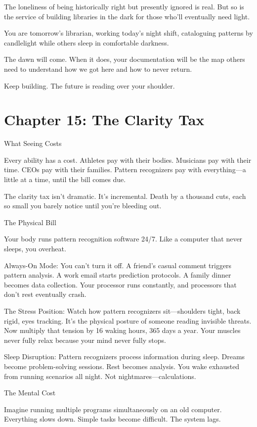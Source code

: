 \documentclass[12pt,oneside]{book}
\begin{document}
The loneliness of being historically right but presently ignored is real. But so is the service of building libraries in the dark for those who'll eventually need light.

You are tomorrow's librarian, working today's night shift, cataloguing patterns by candlelight while others sleep in comfortable darkness.

The dawn will come. When it does, your documentation will be the map others need to understand how we got here and how to never return.

Keep building. The future is reading over your shoulder.

\chapter{Chapter 15: The Clarity Tax}

What Seeing Costs

Every ability has a cost. Athletes pay with their bodies. Musicians pay with their time. CEOs pay with their families. Pattern recognizers pay with everything---a little at a time, until the bill comes due.

The clarity tax isn't dramatic. It's incremental. Death by a thousand cuts, each so small you barely notice until you're bleeding out.

The Physical Bill

Your body runs pattern recognition software 24/7. Like a computer that never sleeps, you overheat.

Always-On Mode: You can't turn it off. A friend's casual comment triggers pattern analysis. A work email starts prediction protocols. A family dinner becomes data collection. Your processor runs constantly, and processors that don't rest eventually crash.

The Stress Position: Watch how pattern recognizers sit---shoulders tight, back rigid, eyes tracking. It's the physical posture of someone reading invisible threats. Now multiply that tension by 16 waking hours, 365 days a year. Your muscles never fully relax because your mind never fully stops.

Sleep Disruption: Pattern recognizers process information during sleep. Dreams become problem-solving sessions. Rest becomes analysis. You wake exhausted from running scenarios all night. Not nightmares---calculations.

The Mental Cost

Imagine running multiple programs simultaneously on an old computer. Everything slows down. Simple tasks become difficult. The system lags.
\end{document}
